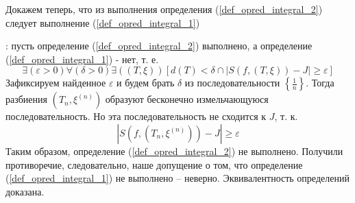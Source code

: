 Докажем теперь, что из выполнения определения (\ref{def_opred_integral_2}) следует выполнение (\ref{def_opred_integral_1})

\dokvo
\pp: пусть определение (\ref{def_opred_integral_2}) выполнено, а определение (\ref{def_opred_integral_1}) - нет, т. е. 
$$
\exists(\varepsilon>0)\forall(\delta>0)\exists((T,\xi))[d(T)<\delta \cap |S(f,(T,\xi))-J|\geq \varepsilon]
$$
Зафиксируем найденное $\varepsilon$ и будем брать $\delta$ из последовательности $\left\{\frac{1}{n}\right\}$. Тогда разбиения $\left(T_n,\xi^{(n)}\right)$ образуют бесконечно измельчающуюся последовательность. Но эта последовательность не сходится к $J$, т. к.
$$\left|S\left(f,\left(T_n,\xi^{(n)}\right)\right)-J\right|\geq \varepsilon$$
Таким образом, определение (\ref{def_opred_integral_2}) не выполнено. Получили противоречие, следовательно, наше допущение о том, что определение (\ref{def_opred_integral_1}) не выполнено -- неверно.
Эквивалентность определений доказана.

\dokno
